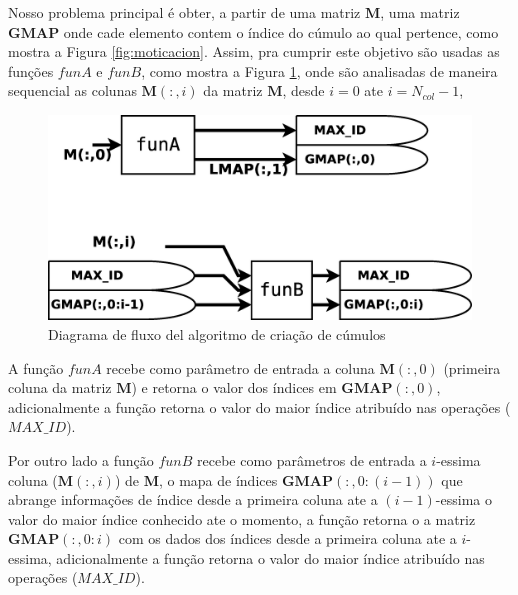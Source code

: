 \documentclass[a4paper,10pt]{article}
\begin{document}
Nosso problema principal é obter, a partir de uma matriz $\mathbf{M}$, 
 uma matriz $\mathbf{GMAP}$ onde cade elemento contem
o índice do cúmulo ao qual pertence, como mostra a Figura \ref{fig:moticacion}.
Assim, pra cumprir este objetivo são usadas as funções $funA$ e $funB$, como mostra  a
Figura \ref{fig:modelocumulos}, onde são analisadas de maneira sequencial as colunas $\mathbf{M}(:,i)$ da
matriz $\mathbf{M}$, desde $i=0$ ate $i=N_{col}-1$, 
\begin{figure}[!htb]
\centering
\includegraphics[scale=0.25]{DiagramaCompleto.eps}
\caption{Diagrama de fluxo del algoritmo de criação de cúmulos }
\label{fig:modelocumulos}
\end{figure}

A função $funA$ recebe como parâmetro de entrada a coluna $\mathbf{M}(:,0)$
(primeira coluna da matriz $\mathbf{M}$)
e retorna o valor dos índices em $\mathbf{GMAP}(:,0)$,
adicionalmente a função retorna o valor do maior índice atribuído nas operações ($MAX\_ID$).

Por outro lado a função $funB$ recebe como parâmetros de entrada a $i$-essima 
coluna ($\mathbf{M}(:,i)$) de $\mathbf{M}$, o mapa de índices $\mathbf{GMAP}(:,0:(i-1))$
que abrange informações de índice desde a primeira coluna ate a $(i-1)$-essima 
o valor do maior índice conhecido ate o momento, a função retorna
o a matriz $\mathbf{GMAP}(:,0:i)$ com os dados dos índices desde a primeira coluna ate a $i$-essima,
adicionalmente a função retorna o valor do maior índice atribuído nas operações ($MAX\_ID$).
\end{document}
